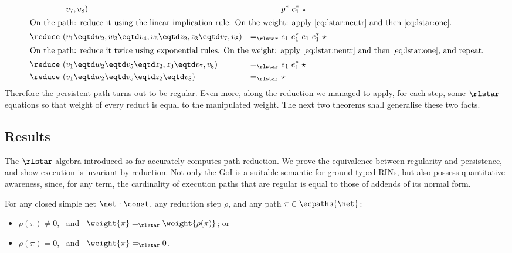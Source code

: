 \begin{example}
\begin{align*}
  \\
  &
    v_7,v_8)
  &&
    p^*\ e^*_1\ \star
 \\
\intertext{On the path: reduce it using the linear implication rule.
  On the weight: apply \autoref{eq:lstar:neutr} and then \ref{eq:lstar:one}.}
  \reduce\ (&
    v_1 \eqtd w_2,w_3 \eqtd v_4,v_5 \eqtd z_2,z_3 \eqtd v_7,v_8)
  &=_{\rlstar}\ &
    e_1\ e^*_1\ e_1\ e^*_1\ \star
\\
\intertext{On the path: reduce it twice using exponential rules.
  On the weight: apply \autoref{eq:lstar:neutr} and then \ref{eq:lstar:one}, 
  and repeat.}
  \reduce\ (&
    v_1 \eqtd w_2 \eqtd v_5 \eqtd z_2,z_3 \eqtd v_7,v_8)
  &=_{\rlstar}\ &
    e_1\ e^*_1\ \star
\\
  \reduce\ (&
    v_1 \eqtd w_2 \eqtd v_5 \eqtd z_2 \eqtd v_8)
  &=_{\rlstar}\ &
    \star
\end{align*}
Therefore the persistent path turns out to be regular.
Even more, along the reduction we managed to apply, for each step, some
$\rlstar$ equations so that weight of every reduct is equal to the manipulated 
weight.
The next two theorems shall generalise these two facts.
\end{example}

\subsection{Results}

The $\rlstar$ algebra introduced so far accurately computes path reduction.
We prove the equivalence between regularity and persistence, and
show execution is invariant by reduction.
Not only the GoI is a suitable semantic for ground typed RINs, but also possess 
quantitative-awareness, since, for any term, the cardinality of execution paths 
that are regular is equal to those of addends of its normal form.

\begin{lemma}\label{lem:RIN:weight-inv}
For any closed simple net $\net:\const$,
any reduction step $\rho$, and
any path $\pi \in \ecpaths{\net}$:
\begin{itemize}
  \item $\rho(\pi) \neq 0$, \  and \ 
    $\weight{\pi} =_\rlstar \weight{\rho(\pi)}$; or
  \item $\rho(\pi) = 0$, \ and \ 
    $\weight{\pi} =_\rlstar 0$.
\end{itemize}
\end{lemma}

